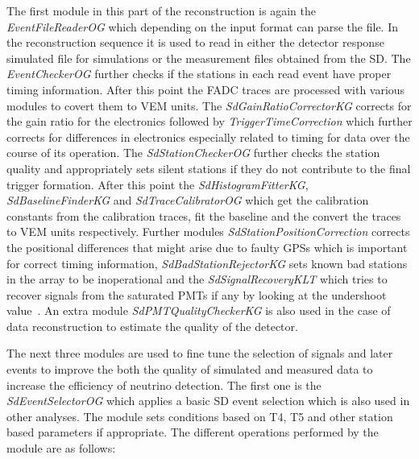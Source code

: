 The first module in this part of the reconstruction is again the \textit{EventFileReaderOG} which depending on the input format can parse the file. In the reconstruction sequence it is used to read in either the detector response simulated file for simulations or the measurement files obtained from the SD. The \textit{EventCheckerOG} further checks if the stations in each read event have proper timing information. After this point the FADC traces are processed with various modules to covert them to VEM units. The \textit{SdGainRatioCorrectorKG} corrects for the gain ratio for the electronics followed by \textit{TriggerTimeCorrection} which further corrects for differences in electronics especially related to timing for data over the course of its operation. The \textit{SdStationCheckerOG} further checks the station quality and appropriately sets silent stations if they do not contribute to the final trigger formation. After this point the \textit{SdHistogramFitterKG}, \textit{SdBaselineFinderKG} and \textit{SdTraceCalibratorOG} which get the calibration constants from the calibration traces, fit the baseline and the convert the traces to VEM units respectively. Further modules \textit{SdStationPositionCorrection} corrects the positional differences that might arise due to faulty GPSs which is important for correct timing information, \textit{SdBadStationRejectorKG} sets known bad stations in the array to be inoperational and the \textit{SdSignalRecoveryKLT} which tries to recover signals from the saturated PMTs if any by looking at the undershoot value~\cite{}. An extra module \textit{SdPMTQualityCheckerKG} is also used in the case of data reconstruction to estimate the quality of the detector.

The next three modules are used to fine tune the selection of signals and later events to improve the both the quality of simulated and measured data to increase the efficiency of neutrino detection. The first one is the \textit{SdEventSelectorOG} which applies a basic SD event selection which is also used in other analyses. The module sets conditions based on T4, T5 and other station based parameters if appropriate. The different operations performed by the module are as follows:

